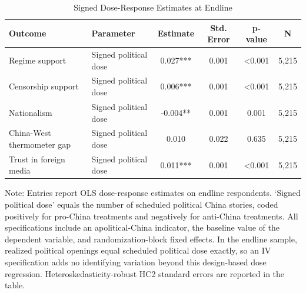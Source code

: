 \begin{table}[H]
\centering
\caption{Signed Dose-Response Estimates at Endline}
\label{tab:signed_dose_response_t1}
\footnotesize
\begin{threeparttable}
\begin{tabular}{llcccc}
\toprule
Outcome & Parameter & Estimate & Std. Error & p-value & N \\
\midrule
Regime support & Signed political dose & 0.027*** & 0.001 & <0.001 & 5,215 \\
Censorship support & Signed political dose & 0.006*** & 0.001 & <0.001 & 5,215 \\
Nationalism & Signed political dose & -0.004** & 0.001 & 0.001 & 5,215 \\
China-West thermometer gap & Signed political dose & 0.010 & 0.022 & 0.635 & 5,215 \\
Trust in foreign media & Signed political dose & 0.011*** & 0.001 & <0.001 & 5,215 \\
\bottomrule
\end{tabular}
\begin{tablenotes}[flushleft]
\footnotesize
\item Note: Entries report OLS dose-response estimates on endline respondents. `Signed political dose' equals the number of scheduled political China stories, coded positively for pro-China treatments and negatively for anti-China treatments. All specifications include an apolitical-China indicator, the baseline value of the dependent variable, and randomization-block fixed effects. In the endline sample, realized political openings equal scheduled political dose exactly, so an IV specification adds no identifying variation beyond this design-based dose regression. Heteroskedasticity-robust HC2 standard errors are reported in the table.
\end{tablenotes}
\end{threeparttable}
\end{table}
